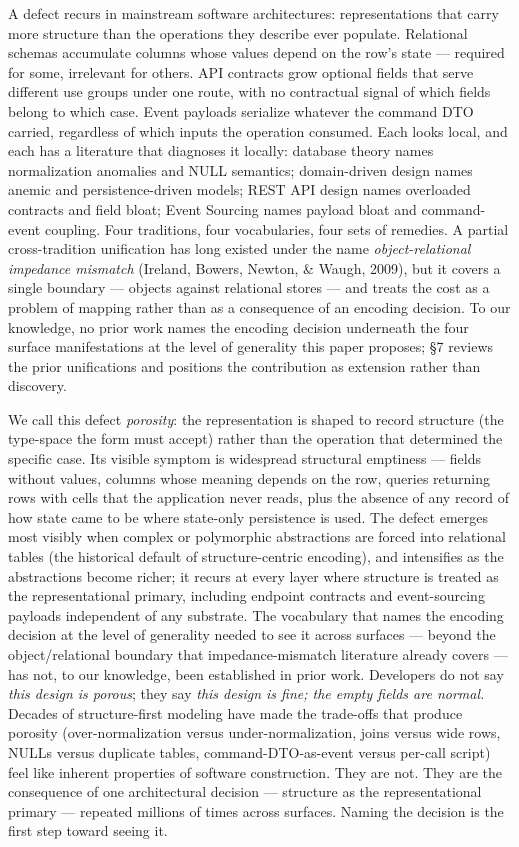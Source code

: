\documentclass[
]{article}
\begin{document}
A defect recurs in mainstream software architectures: representations
that carry more structure than the operations they describe ever
populate. Relational schemas accumulate columns whose values depend on
the row's state --- required for some, irrelevant for others. API
contracts grow optional fields that serve different use groups under one
route, with no contractual signal of which fields belong to which case.
Event payloads serialize whatever the command DTO carried, regardless of
which inputs the operation consumed. Each looks local, and each has a
literature that diagnoses it locally: database theory names
normalization anomalies and NULL semantics; domain-driven design names
anemic and persistence-driven models; REST API design names overloaded
contracts and field bloat; Event Sourcing names payload bloat and
command-event coupling. Four traditions, four vocabularies, four sets of
remedies. A partial cross-tradition unification has long existed under
the name \emph{object-relational impedance mismatch} (Ireland, Bowers,
Newton, \& Waugh, 2009), but it covers a single boundary --- objects
against relational stores --- and treats the cost as a problem of
mapping rather than as a consequence of an encoding decision. To our
knowledge, no prior work names the encoding decision underneath the four
surface manifestations at the level of generality this paper proposes;
§7 reviews the prior unifications and positions the contribution as
extension rather than discovery.

We call this defect \emph{porosity}: the representation is shaped to
record structure (the type-space the form must accept) rather than the
operation that determined the specific case. Its visible symptom is
widespread structural emptiness --- fields without values, columns whose
meaning depends on the row, queries returning rows with cells that the
application never reads, plus the absence of any record of how state
came to be where state-only persistence is used. The defect emerges most
visibly when complex or polymorphic abstractions are forced into
relational tables (the historical default of structure-centric
encoding), and intensifies as the abstractions become richer; it recurs
at every layer where structure is treated as the representational
primary, including endpoint contracts and event-sourcing payloads
independent of any substrate. The vocabulary that names the encoding
decision at the level of generality needed to see it across surfaces ---
beyond the object/relational boundary that impedance-mismatch literature
already covers --- has not, to our knowledge, been established in prior
work. Developers do not say \emph{this design is porous}; they say
\emph{this design is fine; the empty fields are normal.} Decades of
structure-first modeling have made the trade-offs that produce porosity
(over-normalization versus under-normalization, joins versus wide rows,
NULLs versus duplicate tables, command-DTO-as-event versus per-call
script) feel like inherent properties of software construction. They are
not. They are the consequence of one architectural decision ---
structure as the representational primary --- repeated millions of times
across surfaces. Naming the decision is the first step toward seeing it.
\end{document}
